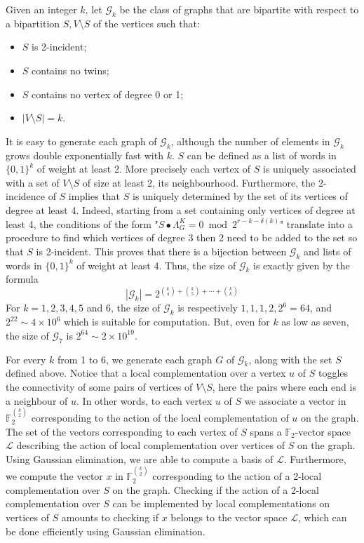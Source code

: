 \documentclass[a4paper,UKenglish,cleveref,autoref,thm-restate]{arxiv}
\newcommand{\sm}{\setminus}
\begin{document}
Given an integer $k$, let $\mathcal G_k$ be the class of graphs that are bipartite with respect to a bipartition $S, V \sm S$ of the vertices such that:
\begin{itemize}
    \item $S$ is 2-incident;
    \item $S$ contains no twins;
    \item $S$ contains no vertex of degree 0 or 1;
    \item $|V \sm S| = k$.
\end{itemize}
It is easy to generate each graph of $\mathcal G_k$, although the number of elements in $\mathcal G_k$ grows double exponentially fast with $k$. $S$ can be defined as a list of words in $\{0,1\}^k$ of weight at least 2. More precisely each vertex of $S$ is uniquely associated with a set of $V \sm S$ of size at least 2, its neighbourhood. Furthermore, the 2-incidence of $S$ implies that $S$ is uniquely determined by the set of its vertices of degree at least 4. Indeed, starting from a set containing only vertices of degree at least 4, the conditions of the form "$S\bullet \Lambda_G^K = 0 \bmod 2^{r-k-\delta(k)}$" translate into a procedure to find which vertices of degree 3 then 2 need to be added to the set so that $S$ is 2-incident. This proves that there is a bijection between $\mathcal G_k$ and lists of words in $\{0,1\}^k$ of weight at least 4. Thus, the size of $\mathcal G_k$ is exactly given by the formula $$ |\mathcal G_k| = 2^{\binom{k}{4} + \binom{k}{5} + \cdots + \binom{k}{k}}$$
For $k=1,2,3,4,5$ and $6$, the size of $\mathcal G_k$ is respectively $1,1,1,2,2^6 = 64$, and $2^{22} \sim 4 \times 10^6$ which is suitable for computation. But, even for $k$ as low as seven, the size of $\mathcal G_7$ is $2^{64} \sim 2 \times 10^{19}$.

For every $k$ from 1 to 6, we generate each graph $G$ of $\mathcal G_k$, along with the set $S$ defined above. Notice that a local complementation over a vertex $u$ of $S$ toggles the connectivity of some pairs of vertices of $V \sm S$, here the pairs where each end is a neighbour of $u$. In other words, to each vertex $u$ of $S$ we associate a vector in $\mathbb F_2^{\binom{k}{2}}$ corresponding to the action of the local complementation of $u$ on the graph. The set of the vectors corresponding to each vertex of $S$ spans a $\mathbb F_2$-vector space $\mathcal L$ describing the action of local complementation over vertices of $S$ on the graph. Using Gaussian elimination, we are able to compute a basis of $\mathcal L$. Furthermore, we compute the vector $x$ in $\mathbb F_2^{\binom{k}{2}}$ corresponding to the action of a 2-local complementation over $S$ on the graph. Checking if the action of a 2-local complementation over $S$ can be implemented by local complementations on vertices of $S$ amounts to checking if $x$ belongs to the vector space $\mathcal L$, which can be done efficiently using Gaussian elimination.
\end{document}
